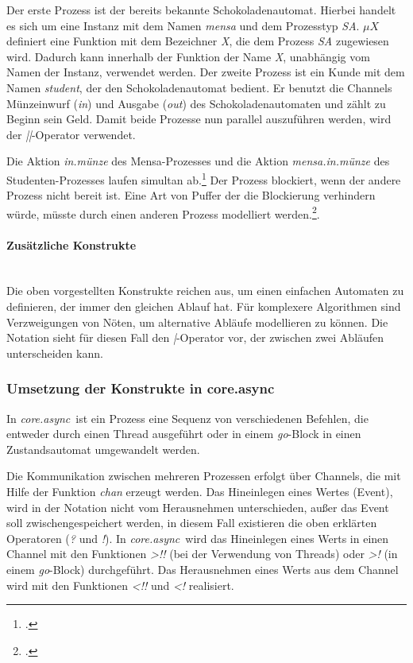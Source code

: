 \documentclass[12pt,a4paper,parskip=half,listof=totoc]{scrreprt}
\newcommand{\CA}{\textit{core.async}}
\begin{document}
Der erste Prozess ist der bereits bekannte Schokoladenautomat. Hierbei handelt es sich um eine Instanz mit dem Namen \textit{mensa} und dem Prozesstyp \textit{SA}. $\mu X$ definiert eine Funktion mit dem Bezeichner \textit{X}, die dem Prozess \textit{SA} zugewiesen wird. Dadurch kann innerhalb der Funktion der Name \textit{X}, unabhängig vom Namen der Instanz,  verwendet werden. Der zweite Prozess ist ein Kunde mit dem Namen \textit{student}, der den Schokoladenautomat bedient. Er benutzt die Channels Münzeinwurf (\textit{in}) und Ausgabe (\textit{out}) des Schokoladenautomaten und zählt zu Beginn sein Geld. Damit beide Prozesse nun parallel auszuführen werden, wird der \textit{||}-Operator verwendet.

Die Aktion \textit{in.münze} des Mensa-Prozesses und die Aktion \textit{mensa.in.münze} des Studenten-Prozesses laufen simultan ab.\footcite[vgl][Seite 117]{CSPBOOK} Der Prozess blockiert, wenn der andere Prozess nicht bereit ist. Eine Art von Puffer der die Blockierung verhindern würde, müsste durch einen anderen Prozess modelliert werden.\footcite[vgl.][Seite 133]{CSPBOOK}.

\paragraph{Zusätzliche Konstrukte}
\ \\
Die oben vorgestellten Konstrukte reichen aus, um einen einfachen Automaten zu definieren, der immer den gleichen Ablauf hat. Für komplexere Algorithmen sind Verzweigungen von Nöten, um alternative Abläufe modellieren zu können. Die Notation sieht für diesen Fall den \textit{|}-Operator vor, der zwischen zwei Abläufen unterscheiden kann.

\subsubsection{Umsetzung der Konstrukte in core.async}
In \CA\ ist ein Prozess eine Sequenz von verschiedenen Befehlen, die entweder durch einen Thread ausgeführt oder in einem \textit{go}-Block in einen Zustandsautomat umgewandelt werden.

Die Kommunikation zwischen mehreren Prozessen erfolgt über Channels, die mit Hilfe der Funktion \textit{chan} erzeugt werden. Das Hineinlegen eines Wertes (Event), wird in der Notation nicht vom Herausnehmen unterschieden, außer das Event soll zwischengespeichert werden, in diesem Fall existieren die oben erklärten Operatoren (\textit{?} und \textit{!}). In \CA\ wird das Hineinlegen eines Werts in einen Channel mit den Funktionen \textit{>!!} (bei der Verwendung von Threads) oder \textit{>!} (in einem \textit{go}-Block) durchgeführt. Das Herausnehmen eines Werts aus dem Channel wird mit den Funktionen \textit{<!!} und \textit{<!} realisiert.
\end{document}
